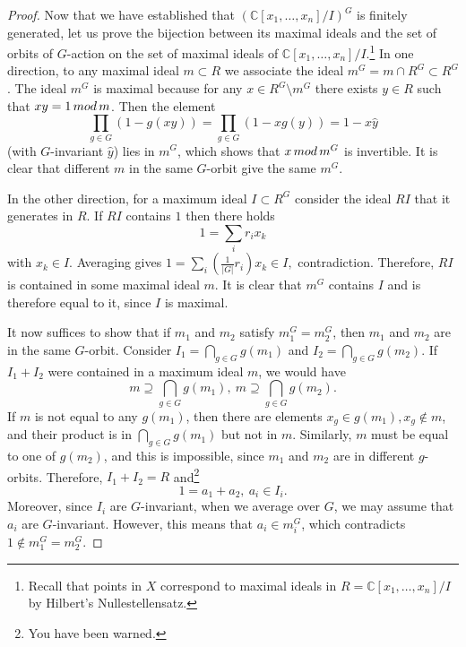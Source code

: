 \documentclass[10pt,a4paper]{amsart}
\newcommand{\C}{{\mathbb C}}
\begin{document}
\begin{proof}
\smallskip
Now that we have established that $(\C[x_1,\ldots,x_n]/I)^G$ is finitely generated, let us prove the bijection between its maximal ideals and the set of orbits of $G$-action on the set of maximal ideals of $\C[x_1,\ldots,x_n]/I$.\footnote{ Recall that points in $X$ correspond to maximal ideals in $R=\C[x_1,\ldots,x_n]/I$ by Hilbert's Nullestellensatz.} In one direction, to any maximal ideal $m\subset R$ we associate the ideal $m^G = m\cap R^G\subset R^G$. The ideal $m^G$ is maximal because for any 
$x\in R^G\setminus m^G$ there exists $y\in R$ such that $xy=1\,{\rm mod}\,m$. Then
the element 
$$
\prod_{g\in G} (1 - g(x y))  = \prod_{g\in G} (1 - x g(y))  = 1 - x\hat y
$$
(with $G$-invariant $\hat y$) lies in $m^G$, which shows that $x \,{\rm mod}\,m^G$ is invertible. It is clear that different $m$ in the same $G$-orbit give the same $m^G$.

\smallskip
In the other direction, for a maximum ideal $I\subset R^G$ consider the ideal $RI$ that it generates in $R$. If $RI$ contains $1$
then there holds
$$
1 = \sum_i r_i x_k
$$
with $x_k\in I$. Averaging gives $1 =\sum_i \left (\frac 1{|G|}r_i\right)x_k\in I,$ contradiction. Therefore, $RI$ is contained in some maximal ideal $m$. It is clear that $m^G$ contains $I$ and is therefore equal to it, since $I$ is maximal.

\smallskip
It now suffices to show that if $m_1$ and $m_2$ satisfy $m_1^G=m_2^G$, then $m_1$ and $m_2$ are in the same $G$-orbit.
Consider $I_1 = \bigcap_{g\in G} g(m_1)$ and $I_2= \bigcap_{g\in G} g(m_2)$. If $I_1+ I_2$ were contained in a maximum ideal $m$,
we would have 
$$
m\supseteq \bigcap_{g\in G} g(m_1),~m\supseteq \bigcap_{g\in G} g(m_2).
$$
If $m$ is not equal to any $g(m_1)$, then there are elements $x_g\in g(m_1),x_g\not\in m$, and their product is in $ \bigcap_{g\in G} g(m_1)$ but not in $m$. Similarly, $m$ must be equal to one of $g(m_2)$, and this is impossible, since $m_1$ and $m_2$ are in different $g$-orbits. Therefore, $I_1+I_2=R$ and\footnote{ You have been warned.}
$$
1 = a_1+a_2,~a_i\in I_i.
$$
Moreover, since $I_i$ are $G$-invariant, when we average over $G$, we may assume that $a_i$ are $G$-invariant. However, this means that $a_i\in m_i^G$, which contradicts $1\not\in m_1^G=m_2^G$.
\end{proof}
\end{document}
